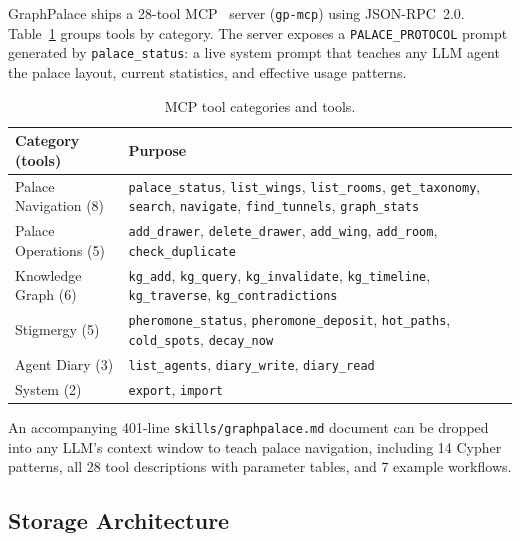 \documentclass[11pt,a4paper]{article}
\begin{document}
GraphPalace ships a 28-tool MCP~\cite{anthropic_mcp2024} server (\texttt{gp-mcp})
using JSON-RPC~2.0.  Table~\ref{tab:mcp_tools} groups tools by category.  The
server exposes a \texttt{PALACE\_PROTOCOL} prompt generated by
\texttt{palace\_status}: a live system prompt that teaches any LLM agent the
palace layout, current statistics, and effective usage patterns.

\begin{table}[ht]
\centering
\caption{MCP tool categories and tools.}
\label{tab:mcp_tools}
\begin{tabular}{lp{8cm}}
\toprule
\textbf{Category (tools)} & \textbf{Purpose} \\
\midrule
Palace Navigation (8) & \texttt{palace\_status}, \texttt{list\_wings}, \texttt{list\_rooms},
    \texttt{get\_taxonomy}, \texttt{search}, \texttt{navigate},
    \texttt{find\_tunnels}, \texttt{graph\_stats} \\
Palace Operations (5) & \texttt{add\_drawer}, \texttt{delete\_drawer}, \texttt{add\_wing},
    \texttt{add\_room}, \texttt{check\_duplicate} \\
Knowledge Graph (6)   & \texttt{kg\_add}, \texttt{kg\_query}, \texttt{kg\_invalidate},
    \texttt{kg\_timeline}, \texttt{kg\_traverse}, \texttt{kg\_contradictions} \\
Stigmergy (5)         & \texttt{pheromone\_status}, \texttt{pheromone\_deposit},
    \texttt{hot\_paths}, \texttt{cold\_spots}, \texttt{decay\_now} \\
Agent Diary (3)       & \texttt{list\_agents}, \texttt{diary\_write}, \texttt{diary\_read} \\
System (2)            & \texttt{export}, \texttt{import} \\
\bottomrule
\end{tabular}
\end{table}

An accompanying 401-line \texttt{skills/graphpalace.md} document can be dropped
into any LLM's context window to teach palace navigation, including 14 Cypher
patterns, all 28 tool descriptions with parameter tables, and 7 example
workflows.

\subsection{Storage Architecture}
\label{sec:storage}
\end{document}
